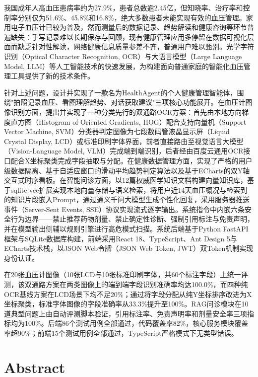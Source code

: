 \documentclass[zihao=-4,a4paper]{ctexart}
\numberwithin{figure}{section}
\numberwithin{table}{section}
\begin{document}
{\songti
我国成年人高血压患病率约为27.9\%，患者总数逾2.45亿，但知晓率、治疗率和控制率分别仅为51.6\%、45.8\%和16.8\%，绝大多数患者未能实现有效的血压管理。家用电子血压计已较为普及，然而测量后的数据记录、趋势解读和健康咨询等环节普遍缺失：手写记录难以长期保存与回顾，现有健康管理应用多停留在数据可视化层面而缺乏针对性解读，网络健康信息质量参差不齐，普通用户难以甄别。光学字符识别（Optical Character Recognition, OCR）与大语言模型（Large Language Model, LLM）等人工智能技术的快速发展，为构建面向普通家庭的智能化血压管理工具提供了新的技术条件。

针对上述问题，设计并实现了一款名为HealthAgent的个人健康管理智能体，围绕"拍照记录血压、看图理解趋势、对话获取建议"三项核心功能展开。在血压计图像识别方面，提出并实现了一种分类先行的双通路OCR方案：首先由本地方向梯度直方图（Histogram of Oriented Gradients, HOG）配合支持向量机（Support Vector Machine, SVM）分类器判定图像为七段数码管液晶显示屏（Liquid Crystal Display, LCD）或标准印刷字体界面，前者直接路由至视觉语言大模型（Vision-Language Model, VLM）完成端到端识别，后者经由百度云通用OCR接口配合X坐标聚类完成字段抽取与分配。在健康数据管理方面，实现了严格的用户级数据隔离、基于自适应窗口的滑动平均趋势判定算法以及基于ECharts的双Y轴交互式时序看板。在智能问诊方面，以12篇权威医学知识文档构建向量知识库，基于sqlite-vec扩展实现本地向量存储与语义检索，将用户近14天血压概况与检索到的知识片段嵌入Prompt，通过通义千问大模型生成个性化回复，采用服务器推送事件（Server-Sent Events, SSE）协议实现流式逐字输出。系统指令中内嵌六条安全行为边界——禁止推荐药物剂量、禁止确定性诊断、强制引用标注与免责声明，并在模型输出侧辅以规则引擎进行高危模式扫描。系统后端基于Python FastAPI框架与SQLite数据库构建，前端采用React 18、TypeScript、Ant Design 5与ECharts技术栈，以JSON Web令牌（JSON Web Token, JWT）双Token机制实现身份认证。

在20张血压计图像（10张LCD与10张标准印刷字体，共60个标注字段）上统一评测，该双通路方案在两类图像上的端到端字段识别准确率均达100.0\%，而四种纯OCR基线方案在LCD场景下均不足20\%；通过将字段分配从纯Y坐标排序改进为X坐标聚类，标准字体图像的字段准确率从33.3\%提升至100\%。RAG问诊模块在10道典型问题上由自动评测脚本验证，引用标注率、免责声明率和剂量安全率三项指标均为100\%。后端86个测试用例全部通过，代码覆盖率82\%，核心服务模块覆盖率超90\%；前端15个测试用例全部通过，TypeScript严格模式下无类型错误。
}

\vspace{1cm}

\newpage
\section*{Abstract}
\end{document}
